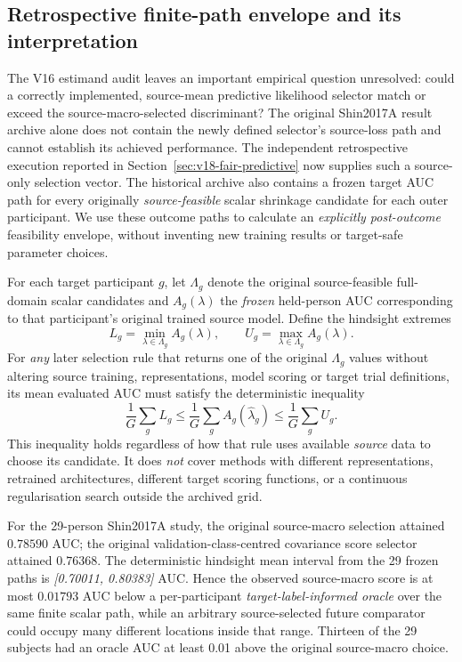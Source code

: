 \subsection{Retrospective finite-path envelope and its interpretation}
\label{sec:v17-predictive-feasibility}
The V16 estimand audit leaves an important empirical question unresolved:
could a correctly implemented, source-mean predictive likelihood
selector match or exceed the source-macro-selected discriminant?
The original Shin2017A result archive alone does not contain the
newly defined selector's source-loss path and cannot establish its
achieved performance. The independent retrospective execution
reported in Section~\ref{sec:v18-fair-predictive} now supplies
such a source-only selection vector. The historical archive also
contains a frozen target AUC path for
every originally \emph{source-feasible} scalar shrinkage candidate
for each outer participant. We use these outcome paths to calculate
an \emph{explicitly post-outcome} feasibility envelope, without
inventing new training results or target-safe parameter choices.

For each target participant $g$, let $\Lambda_g$ denote the original
source-feasible full-domain scalar candidates and $A_g(\lambda)$
the \emph{frozen} held-person AUC corresponding to that participant's
original trained source model. Define the hindsight extremes
\[
 L_g=\min_{\lambda\in\Lambda_g} A_g(\lambda),
 \qquad U_g=\max_{\lambda\in\Lambda_g} A_g(\lambda).
\]
For \emph{any} later selection rule that returns one of the
original $\Lambda_g$ values without altering source training,
representations, model scoring or target trial definitions, its
mean evaluated AUC must satisfy the deterministic inequality
\[
 \frac{1}{G}\sum_gL_g\le
 \frac{1}{G}\sum_gA_g(\widehat\lambda_g)
 \le\frac{1}{G}\sum_gU_g.
\]
This inequality holds regardless of how that rule uses
available \emph{source} data to choose its candidate. It
does \emph{not} cover methods with different representations,
retrained architectures, different target scoring functions,
or a continuous regularisation search outside the archived grid.

For the 29-person Shin2017A study, the original source-macro
selection attained $0.78590$ AUC; the original
validation-class-centred covariance score selector attained
$0.76368$. The deterministic hindsight mean interval
from the 29 frozen paths is \emph{[0.70011, 0.80383]}
AUC. Hence the observed source-macro score is at most
$0.01793$ AUC below a per-participant \emph{target-label-informed
oracle} over the same finite scalar path, while an arbitrary
source-selected future comparator could occupy many different
locations inside that range. Thirteen of the 29 subjects
had an oracle AUC at least 0.01 above the original
source-macro choice.

